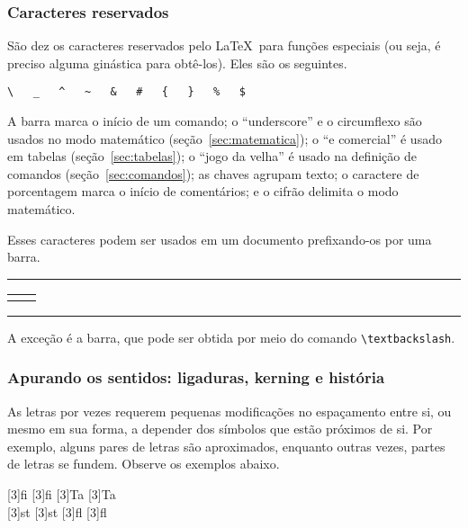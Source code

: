 \subsubsection{Caracteres reservados}

São dez os caracteres reservados pelo \LaTeX\ para funções especiais
(ou seja, é preciso alguma ginástica para obtê-los). Eles são os seguintes.

\begin{center}
\verb'\   _   ^   ~   &   #   {   }   %   $'
\end{center}

A barra marca o início de um comando; o ``underscore'' e o circumflexo
são usados no modo matemático (seção~\ref{sec:matematica}); o ``e
comercial'' é usado em tabelas (seção~\ref{sec:tabelas}); o ``jogo da
velha'' é usado na definição de comandos (seção~\ref{sec:comandos});
as chaves agrupam texto; o caractere de porcentagem marca o início de
comentários; e o cifrão delimita o modo matemático.

Esses caracteres podem ser usados em um documento prefixando-os por
uma barra.

\medskip
\begin{center}\footnotesize\hrule\smallskip
\begin{tabular}{c|c}
\begin{minipage}{.465\textwidth}

\end{minipage} &
\begin{minipage}{.465\textwidth}
\centering 
\end{minipage}
\end{tabular}
\smallskip\hrule
\end{center}
\medskip

A exceção é a barra, que pode ser obtida  por meio do
comando \verb'\textbackslash'.
 
\subsubsection{Apurando os sentidos: ligaduras, kerning e história}

As letras por vezes requerem pequenas modificações no espaçamento
entre si, ou mesmo em sua forma, a depender dos símbolos que estão
próximos de si. Por exemplo, alguns pares de letras são aproximados,
enquanto outras vezes, partes de letras se fundem. Observe os exemplos
abaixo.

\medskip
\noindent\begin{center}%
\scalebox{3}[3]{f{i}}\hfil%
\scalebox{3}[3]{fi}\hfil%
\scalebox{3}[3]{T{a}}\hfil%
\scalebox{3}[3]{Ta}
\\[.9cm] 
\scalebox{3}[3]{s{t}}\hfil%
\scalebox{3}[3]{st}\hfil%
\scalebox{3}[3]{f{l}}\hfil%
\scalebox{3}[3]{fl}
\end{center}
\medskip

